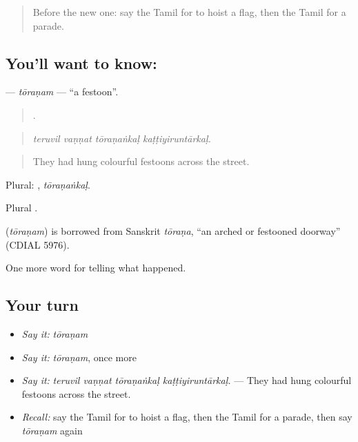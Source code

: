 \label{lesson:TA-C320-toranam}



\begin{quote}
Before the new one: say the Tamil for to hoist a flag, then the Tamil for a parade.
\end{quote}

\subsection*{You'll want to know: }
\textbf{} — \emph{tōraṇam} — \textquotedblleft{}a festoon\textquotedblright{}.

\begin{quote}
   .
\end{quote}

\begin{quote}
\emph{teruvil vaṇṇat tōraṇaṅkaḷ kaṭṭiyiruntārkaḷ.}
\end{quote}

\begin{quote}
They had hung colourful festoons across the street.
\end{quote}

Plural: , \emph{tōraṇaṅkaḷ}.

Plural .

\begin{cousinweb}
\textbf{} (\emph{tōraṇam}) is borrowed from Sanskrit \emph{tōraṇa}, \textquotedblleft{}an arched or festooned doorway\textquotedblright{} (CDIAL 5976).
\end{cousinweb}

\begin{grammarlens}[title={What you've built}]
One more word for telling what happened.
\end{grammarlens}

\subsection*{Your turn}
\begin{itemize}
\raggedright
  \item \emph{Say it:} \emph{tōraṇam}
  \item \emph{Say it:} \emph{tōraṇam}, once more
  \item \emph{Say it:} \emph{teruvil vaṇṇat tōraṇaṅkaḷ kaṭṭiyiruntārkaḷ.} — They had hung colourful festoons across the street.
  \item \emph{Recall:} say the Tamil for to hoist a flag, then the Tamil for a parade, then say \emph{tōraṇam} again
\end{itemize}


